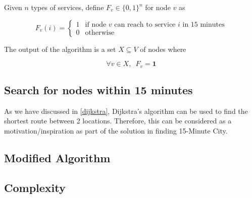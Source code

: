 Given $n$ types of services, define $F_v\in\{0,1\}^n$ for node $v$ as

$$ F_v(i) = \begin{cases}1&\text{if node }v\text{ can reach to service }i\text{ in 15 minutes}\\0&\text{otherwise}\end{cases}$$

The output of the algorithm is a set $X\subseteq V$ of nodes where

$$\forall v\in X,\enspace F_v=\mathbf{1} $$

\subsection{Search for nodes within 15 minutes}

As we have discussed in \ref{dijkstra}, Dijkstra's algorithm can be used to find the shortest route between 2 locations. Therefore, this can be considered as a motivation/inspiration as part of the solution in finding 15-Minute City.


\subsection{Modified Algorithm}

\subsection{Complexity}